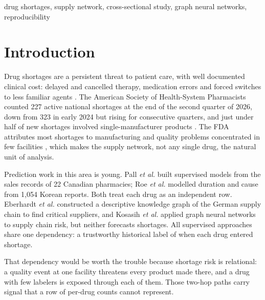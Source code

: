 \documentclass[conference,letterpaper]{IEEEtran}
\begin{document}
\begin{IEEEkeywords}
drug shortages, supply network, cross-sectional study, graph neural networks,
reproducibility
\end{IEEEkeywords}

\section{Introduction}

Drug shortages are a persistent threat to patient care, with well documented
clinical cost: delayed and cancelled therapy, medication errors and forced
switches to less familiar agents \cite{mclaughlin}. The American Society of
Health-System Pharmacists counted 227 active national shortages at the end of the
second quarter of 2026, down from 323 in early 2024 but rising for consecutive
quarters, and just under half of new shortages involved single-manufacturer
products \cite{ashp}. The FDA attributes most shortages to manufacturing and
quality problems concentrated in few facilities \cite{fdataskforce}, which makes
the supply network, not any single drug, the natural unit of analysis.

Prediction work in this area is young. Pall \emph{et al.} \cite{pall} built
supervised models from the sales records of 22 Canadian pharmacies; Roe
\emph{et al.} \cite{roe} modelled duration and cause from 1{,}054 Korean
reports. Both treat each drug as an independent row. Eberhardt \emph{et
al.} \cite{eberhardt} constructed a descriptive knowledge graph of the German
supply chain to find critical suppliers, and Kosasih \emph{et al.} \cite{kosasih}
applied graph neural networks to supply chain risk, but neither forecasts
shortages. All supervised approaches share one dependency: a trustworthy
historical label of when each drug entered shortage.

That dependency would be worth the trouble because shortage risk is relational:
a quality event at one facility threatens every product made there, and a drug
with few labelers is exposed through each of them. Those two-hop paths carry
signal that a row of per-drug counts cannot represent.
\end{document}
